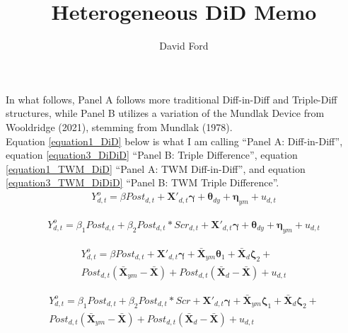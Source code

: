 \documentclass[12pt,a4paper]{article}
\begin{document}
\title{Heterogeneous DiD Memo}
\author{David Ford}
\maketitle

In what follows, Panel A follows more traditional Diff-in-Diff and Triple-Diff structures, while Panel B utilizes a variation of the Mundlak Device from Wooldridge (2021), stemming from Mundlak (1978). \\

Equation \ref{equation1_DiD} below is what I am calling ``Panel A: Diff-in-Diff'', equation \ref{equation3_DiDiD} ``Panel B: Triple Difference'', equation \ref{equation1_TWM_DiD} ``Panel A: TWM Diff-in-Diff'', and equation \ref{equation3_TWM_DiDiD} ``Panel B: TWM Triple Difference''. \\

\begin{equation}
	\begin{split}
		Y^{o}_{d,t} = \beta Post_{d,t} + \boldsymbol{X'}_{d,t} \boldsymbol{\gamma} + \boldsymbol{\theta}_{dy} + \boldsymbol{\eta}_{ym} + u_{d,t} 
	\label{equation1_DiD}
	\end{split}
\end{equation}

\begin{equation} 
	\begin{split}
		Y^{o}_{d,t} = \beta_{1} Post_{d,t} + \beta_{2} Post_{d,t}*Scr_{d,t} + \boldsymbol{X'}_{d,t} \boldsymbol{\gamma} + \boldsymbol{\theta}_{dy} + \boldsymbol{\eta}_{ym} + u_{d,t} 
	\label{equation3_DiDiD}
	\end{split}
\end{equation}

\begin{equation}
	\begin{split}
		Y^{o}_{d,t} = \beta Post_{d,t} + \boldsymbol{X'}_{d,t} \boldsymbol{\gamma} + \boldsymbol{\bar{X}}_{ym} \boldsymbol{\theta}_1 + \boldsymbol{\bar{X}}_{d} \boldsymbol{\zeta}_2 + \\ Post_{d,t} (\boldsymbol{\bar{X}}_{ym} - \boldsymbol{\bar{X}}) + Post_{d,t} (\boldsymbol{\bar{X}}_{d} - \boldsymbol{\bar{X}}) + u_{d,t} 
	\label{equation1_TWM_DiD}
	\end{split}
\end{equation}

\begin{equation} 
	\begin{split}
		Y^{o}_{d,t} = \beta_1 Post_{d,t} + \beta_2 Post_{d,t}*Scr + \boldsymbol{X'}_{d,t} \boldsymbol{\gamma} + \boldsymbol{\bar{X}}_{ym} \boldsymbol{\zeta}_1 + \boldsymbol{\bar{X}}_{d} \boldsymbol{\zeta}_2+ \\ Post_{d,t} (\boldsymbol{\bar{X}}_{ym} - \boldsymbol{\bar{X}}) + Post_{d,t} (\boldsymbol{\bar{X}}_{d} - \boldsymbol{\bar{X}}) + u_{d,t} 
	\label{equation3_TWM_DiDiD}
	\end{split}
\end{equation}
\end{document}
